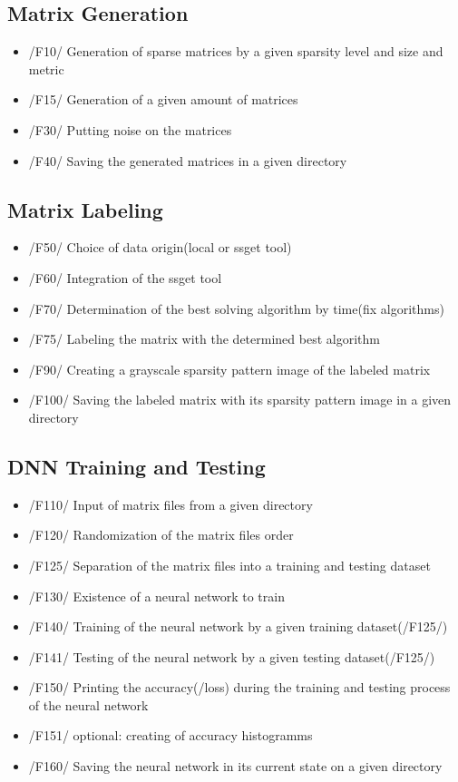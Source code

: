 \documentclass[parskip=full]{scrartcl}
\begin{document}
\subsection{Matrix Generation}
	\begin{itemize}
	\item /F10/ Generation of sparse matrices by a given sparsity level and size and metric
	\item /F15/ Generation of a given amount of matrices
	\item /F30/ Putting noise on the matrices
 	\item /F40/ Saving the generated matrices in a given directory
          \end{itemize}
\subsection{Matrix Labeling}
	\begin{itemize}
	\item /F50/ Choice of data origin(local or ssget tool)
	\item /F60/ Integration of the ssget tool
	\item /F70/ Determination of the best solving algorithm by time(fix algorithms) %
	\item /F75/ Labeling the matrix with the determined best algorithm
	\item /F90/ Creating a grayscale sparsity pattern image of the labeled matrix
	\item /F100/ Saving the labeled matrix with its sparsity pattern image in a given directory 
	\end{itemize}
	
	
\subsection{DNN Training and Testing}
	\begin{itemize}
	\item /F110/ Input of matrix files from a given directory
	\item /F120/ Randomization of the matrix files order
	\item /F125/ Separation of the matrix files into a training and testing dataset
	\item /F130/ Existence of a neural network to train
	\item /F140/ Training of the neural network by a given training dataset(/F125/)
	\item /F141/ Testing of the neural network by a given testing dataset(/F125/)
	\item /F150/ Printing the accuracy(/loss) during the training and testing process of the neural network
	\item /F151/ optional: creating of accuracy histogramms
	\item /F160/ Saving the neural network in its current state on a given directory
	\end{itemize}
 	
\end{document}
